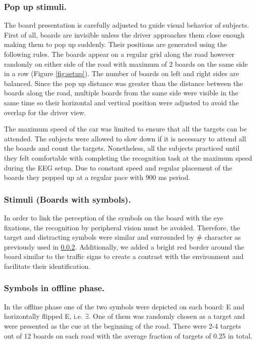 \documentclass[12pt]{iopart}
\begin{document}
\subsubsection{Pop up stimuli.} The board presentation is carefully adjusted to guide visual behavior of subjects.
First of all, boards are invisible unless the driver approaches them
close enough making them to pop up suddenly.
Their positions are generated using the following rules.
The boards appear on a regular grid along the road however
randomly on either side of the road with maximum of 2 boards
on the same side in a row  (Figure \ref{fig:setup}). The number of boards on left
and right sides are balanced. Since the pop up distance was greater
than the distance between the boards along the road, multiple
boards from the same side were visible in the same time
so their horizontal and vertical position were adjusted to avoid
the overlap for the driver view.

The maximum speed of the car was limited to ensure that all the targets
can be attended. The subjects were allowed to slow down if it is necessary
to attend all the boards and count the targets.
Nonetheless, all the subjects practiced until they felt comfortable 
with completing the recognition task at the maximum speed
during the EEG setup.
Due to constant speed and regular placement of the boards they
popped up at a regular pace with 900 ms period.

\subsubsection{Stimuli (Boards with symbols).} In order to link the perception of the symbols on the board
with the eye fixations, the recognition by
peripheral vision must be avoided. Therefore, the target and distracting
symbols were similar and surrounded by \# character as previously used in \ref{}.
Additionally, we added a bright red border around the board similar 
to the traffic signs
to create a contrast with the environment and facilitate
their identification.

\subsubsection*{Symbols in offline phase.}
In the offline phase one of the two symbols were depicted on each board:
E and horizontally flipped E, i.e. $\exists$.
One of them was randomly chosen as a target and were presented as the cue
at the beginning of the road. There were 2-4 targets out of 12 boards
on each road with the average fraction of targets of 0.25 in total.
\end{document}

